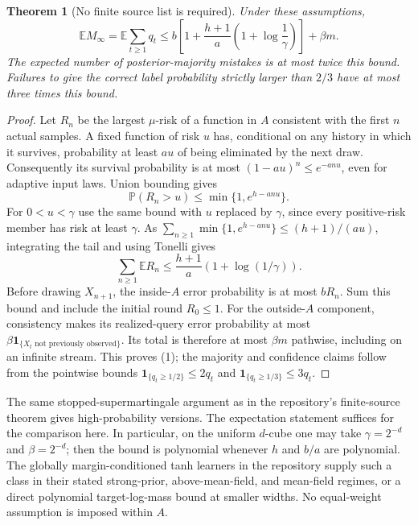 \documentclass[11pt]{article}
\newtheorem{theorem}{Theorem}
\newcommand{\E}{\mathbb E}
\newcommand{\Pp}{\mathbb P}
\begin{document}
\begin{theorem}[No finite source list is required]
Under these assumptions,
\[
 \E M_\infty=\E\sum_{t\ge1}q_t
 \le b\left[1+\frac{h+1}{a}\left(1+\log\frac1\gamma\right)\right]
       +\beta m.                                             \tag{1}
\]
The expected number of posterior-majority mistakes is at most twice
this bound. Failures to give the correct label probability strictly
larger than $2/3$ have at most three times this bound.
\end{theorem}
\begin{proof}
Let $R_n$ be the largest $\mu$-risk of a function in $A$ consistent
with the first $n$ actual samples. A fixed function of risk $u$ has,
conditional on any history in which it survives, probability at least
$au$ of being eliminated by the next draw. Consequently its survival
probability is at most $(1-au)^n\le e^{-anu}$, even for adaptive input
laws. Union bounding gives
\[
 \Pp(R_n>u)\le\min\{1,e^{h-anu}\}.
\]
For $0<u<\gamma$ use the same bound with $u$ replaced by $\gamma$,
since every positive-risk member has risk at least $\gamma$.
As $\sum_{n\ge1}\min\{1,e^{h-anu}\}\le(h+1)/(au)$, integrating
the tail and using Tonelli gives
\[
 \sum_{n\ge1}\E R_n\le\frac{h+1}{a}(1+\log(1/\gamma)).
\]
Before drawing $X_{n+1}$, the inside-$A$ error probability is at most
$bR_n$. Sum this bound and include the initial round $R_0\le1$.
For the outside-$A$ component, consistency makes its realized-query
error probability at most
$\beta\mathbf1_{\{X_t\text{ not previously observed}\}}$.
Its total is therefore at most $\beta m$ pathwise, including on an
infinite stream. This proves (1); the majority and confidence claims
follow from the pointwise bounds $\mathbf1_{\{q_t\ge1/2\}}\le2q_t$
and $\mathbf1_{\{q_t\ge1/3\}}\le3q_t$.
\end{proof}

The same stopped-supermartingale argument as in the repository's
finite-source theorem gives high-probability versions. The expectation
statement suffices for the comparison here. In particular, on the
uniform $d$-cube one may take $\gamma=2^{-d}$ and $\beta=2^{-d}$;
then the bound is polynomial whenever $h$ and $b/a$ are polynomial.
The globally margin-conditioned tanh learners in the repository supply
such a class in their stated strong-prior, above-mean-field, and
mean-field regimes, or a direct polynomial target-log-mass bound at
smaller widths. No equal-weight assumption is imposed within $A$.
\end{document}
